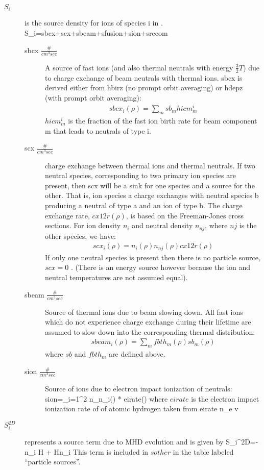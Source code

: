 \begin{description}
 \item[$S_i$] is the source density for ions of species i in .
 \beq
  S_i=sbcx+scx+sbeam+sfusion+sion+srecom
 \eeq
 \begin{description}  %
  \item[sbcx $ \frac{\#}{cm^3sec} $] A source of fast ions (and also thermal
  neutrals with energy $\frac{3}{2}T $) due to charge exchange of beam  neutrals
  with thermal ions. sbcx is derived either from hbirz (no prompt orbit
  averaging) or hdepz (with prompt orbit averaging):
  \begin{eqnarray}
   sbcx_i(\rho)=\sum_m sb_m hicm_m^i
  \end{eqnarray}
  $hicm_m^i$ is the fraction of the fast ion birth rate for beam  component m
  that leads to neutrals of type i.
  \item [scx $\frac{\#}{cm^3sec} $] charge exchange between thermal ions and
  thermal neutrals. If two neutral species, corresponding to two primary ion
  species are present, then scx will be a sink for one species and a source for
  the other. That is, ion species a charge exchanges with neutral species b
  producing a neutral of type a and an ion of type b. The charge exchange rate,
  $ cx12r(\rho)$, is based on the Freeman-Jones\cite{Freeman:1974} cross
  sections. For ion density $n_i $ and  neutral density $n_{nj}$, where $nj$ is
  the other species, we have:
  \begin{eqnarray}
   scx_i(\rho)= n_i(\rho)n_{nj}(\rho)cx12r(\rho)
  \end{eqnarray}
  If only one neutral species is present then there is no particle source, $
  scx=0$ . (There is an energy source however because the ion and neutral
  temperatures are not assumed equal).
  \item[sbeam $\frac{\#}{cm^3sec}$]  Source of thermal ions due to beam slowing
  down. All fast ions which do not experience charge exchange during their
  lifetime are assumed to slow down into the corresponding thermal distribution:
  \begin{eqnarray}
   sbeam_i(\rho)= \sum_mfbth_m(\rho) sb_m(\rho) 
  \end{eqnarray}
  where $sb$ and $fbth_m$ are  defined above.
  \item[sion $\frac{\#}{cm^3sec}$] Source of ions due to electron impact
  ionization of neutrals:
  \beq
   sion=\sum_{i=1}^2 n_{n_i}(\rho) * eirate(\rho)
  \eeq
  where $eirate$ is the electron impact ionization rate of
  of atomic hydrogen taken from \cite{Freeman:1974} 
  \beq
   eirate \equiv n_e \langle \sigma v \rangle
  \eeq
 \end{description} %
 \item[$S_i^{2D}$] represents a source term due to MHD evolution and is given by
 \beq
  S_i^{2D}=-n_i \ln H + \ddiff{\rho}Hn_i
 \eeq
 This term is included in $sother $ in the table labeled ``particle sources''.
\end{description}

